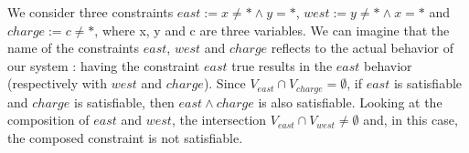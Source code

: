 \begin{example}
	We consider three constraints $east := x \not =* \land y=* $, $west := y \not = * \land x=* $ and $charge := c \not = * $, where x, y and c are three variables. We can imagine that the name of the constraints $east$, $west$ and $charge$ reflects to the actual behavior of our system : having the constraint $east$ true results in the $east$ behavior (respectively with $west$ and $charge$). Since $V_{east} \cap V_{charge} = \emptyset$, if $east$ is satisfiable and $charge$ is satisfiable, then $east \land charge$ is also satisfiable. Looking at the composition of $east$ and $west$, the intersection $V_{east} \cap V_{west} \not= \emptyset$ and, in this case, the composed constraint is not satisfiable. 
\end{example}
